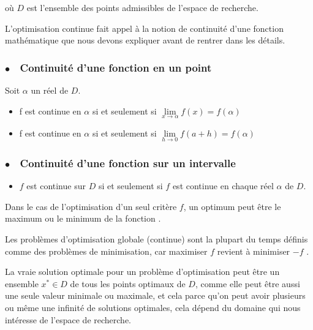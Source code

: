 où $D$ est l'ensemble des points admissibles de l'espace de recherche.

L'optimisation continue fait appel à la notion de continuité d'une fonction mathématique que nous devons expliquer avant de rentrer dans les détails.

\subsubsection{$\bullet\quad$Continuité d'une fonction en un point\cite{continue}}
Soit $\alpha$ un réel de $D$.

\begin{itemize}
	\item f est continue en $\alpha$ si et seulement si $\lim\limits_{x \rightarrow \alpha}f(x)=f(\alpha)$
	\item f est continue en $\alpha$ si et seulement si $\lim\limits_{h \rightarrow 0}f(a + h)=f(\alpha)$
\end{itemize}


\subsubsection{$\bullet\quad$Continuité d'une fonction sur un intervalle\cite{continue}}

\begin{itemize}
	\item $f$ est continue sur $D$ si et seulement si $f$ est continue en chaque réel $\alpha$ de $D$.
\end{itemize}


\vspace{1em}

Dans le cas de l'optimisation d'un seul critère $f$, un optimum peut être
le maximum ou le minimum de la fonction \cite{Momin_Yang_2013}.

Les problèmes d'optimisation
globale (continue) sont la plupart du temps définis comme des problèmes de
minimisation, car maximiser $f$ revient à minimiser $-f$ \cite{cvijovic1995taboo}.

\vspace{1em}

La vraie solution optimale pour un problème d'optimisation peut être
un ensemble $x^* \in D$  de tous les points optimaux de $D$,
comme elle peut être aussi une seule valeur minimale ou maximale, et cela parce qu'on peut avoir plusieurs ou même une infinité de solutions optimales, cela dépend du
domaine qui nous intéresse de l'espace de recherche.


